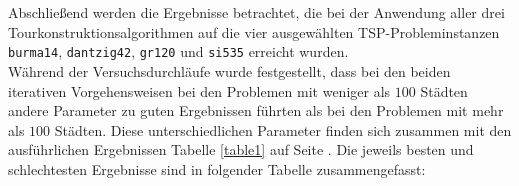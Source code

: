 \documentclass[doktyp=barbeit, sprache=german]{TUBAFarbeiten}
\begin{document}
\\\\Abschließend werden die Ergebnisse betrachtet, die bei der Anwendung aller drei Tourkonstruktionsalgorithmen auf die vier ausgewählten TSP-Probleminstanzen \texttt{burma14}, \texttt{dantzig42}, \texttt{gr120} und \texttt{si535} erreicht wurden. 
\\Während der Versuchsdurchläufe wurde festgestellt, dass bei den beiden iterativen Vorgehensweisen bei den Problemen mit weniger als $100$ Städten andere Parameter zu guten Ergebnissen führten als bei den Problemen mit mehr als $100$ Städten. Diese unterschiedlichen Parameter finden sich zusammen mit den ausführlichen Ergebnissen Tabelle \ref{table1} auf Seite \pageref{table1}. Die jeweils besten und schlechtesten Ergebnisse sind in folgender Tabelle zusammengefasst:
\begin{table}[]
\centering
{}
\end{table}
\end{document}
